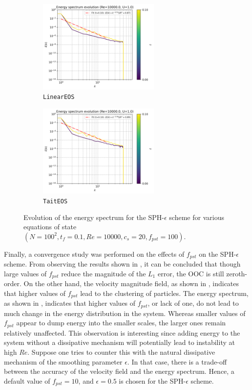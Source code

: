 \begin{figure}[htbp!]
  \begin{subfigure}{7cm}
  \centering\includegraphics[width=6cm]{Code-Figures/mon2017/eos/c0_20_linear_pec_dtmul_1_nx_100_pst_10_re_10000_mon2017/energy_spectrum_evolution.png}
  \caption{\texttt{LinearEOS}}
  \end{subfigure}
  \begin{subfigure}{7cm}
  \centering\includegraphics[width=6cm]{Code-Figures/mon2017/eos/c0_20_tait_pec_dtmul_1_nx_100_pst_10_re_10000_mon2017/energy_spectrum_evolution.png}
  \caption{\texttt{TaitEOS}}
  \end{subfigure}
  \caption{Evolution of the energy spectrum for the SPH-$\epsilon$ scheme for various equations of state $(N=100^2, t_f=0.1, Re=10000, c_s=20, f_{pst}=100)$.}
  \label{fig:sph-eps-eos-espec}
\end{figure}

Finally, a convergence study was performed on the effects of $f_{pst}$ on the SPH-$\epsilon$ scheme. From observing the results shown in , it can be concluded that though large values of $f_{pst}$ reduce the magnitude of the $L_1$ error, the OOC is still zeroth-order.
On the other hand, the velocity magnitude field, as shown in , indicates that higher values of $f_{pst}$ lead to the clustering of particles.
The energy spectrum, as shown in , indicates that higher values of $f_{pst}$, or lack of one, do not lead to much change in the energy distribution in the system. Whereas smaller values of $f_{pst}$ appear to dump energy into the smaller scales, the larger ones remain relatively unaffected.
This observation is interesting since adding energy to the system without a dissipative mechanism will potentially lead to instability at high $Re$. Suppose one tries to counter this with the natural dissipative mechanism of the smoothing parameter $\epsilon$. In that case, there is a trade-off between the accuracy of the velocity field and the energy spectrum.
Hence, a default value of $f_{pst} = 10$, and $\epsilon = 0.5$ is chosen for the SPH-$\epsilon$ scheme.

